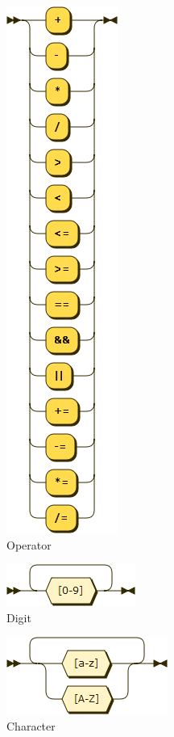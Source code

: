 \begin{figure}[h!]
\centering
\includegraphics[scale=1]{kepek/rr_operator.png}
\caption{Operator}
\label{fig:rr_operator}
\end{figure}

\begin{figure}[h!]
\centering
\includegraphics[scale=1]{kepek/rr_digit.png}
\caption{Digit}
\label{fig:rr_digit}
\end{figure}

\begin{figure}[h!]
\centering
\includegraphics[scale=1]{kepek/rr_character.png}
\caption{Character}
\label{fig:rr_character}
\end{figure}

